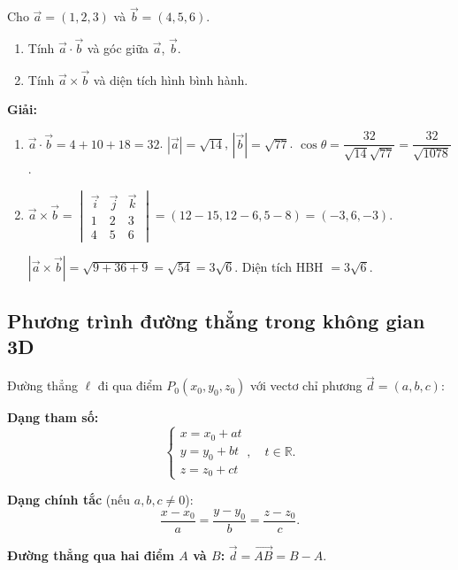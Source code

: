 \documentclass[12pt,a4paper]{article}
\begin{document}
\begin{vidu}
  Cho $\vec{a} = (1, 2, 3)$ và $\vec{b} = (4, 5, 6)$.
  \begin{enumerate}[label=(\alph*)]
    \item Tính $\vec{a}\cdot\vec{b}$ và góc giữa $\vec{a}$, $\vec{b}$.
    \item Tính $\vec{a}\times\vec{b}$ và diện tích hình bình hành.
  \end{enumerate}

  \medskip\textbf{Giải:}
  \begin{enumerate}[label=(\alph*)]
    \item $\vec{a}\cdot\vec{b} = 4 + 10 + 18 = 32$. $|\vec{a}| = \sqrt{14}$, $|\vec{b}| = \sqrt{77}$.
      $\cos\theta = \dfrac{32}{\sqrt{14}\sqrt{77}} = \dfrac{32}{\sqrt{1078}}$.

    \item $\vec{a}\times\vec{b} = \begin{vmatrix}\vec{i}&\vec{j}&\vec{k}\\1&2&3\\4&5&6\end{vmatrix} = (12-15, 12-6, 5-8) = (-3, 6, -3)$.

      $|\vec{a}\times\vec{b}| = \sqrt{9+36+9} = \sqrt{54} = 3\sqrt{6}$. Diện tích HBH $= 3\sqrt{6}$.
  \end{enumerate}
\end{vidu}

\subsection{Phương trình đường thẳng trong không gian 3D}

\begin{dinhnghia}[title={Phương trình đường thẳng}]
  Đường thẳng $\ell$ đi qua điểm $P_0(x_0, y_0, z_0)$ với vectơ chỉ phương $\vec{d} = (a, b, c)$:

  \textbf{Dạng tham số:}
  \[
    \begin{cases} x = x_0 + at \\ y = y_0 + bt \\ z = z_0 + ct \end{cases}, \quad t \in \mathbb{R}.
  \]

  \textbf{Dạng chính tắc} (nếu $a, b, c \ne 0$):
  \[
    \frac{x - x_0}{a} = \frac{y - y_0}{b} = \frac{z - z_0}{c}.
  \]

  \textbf{Đường thẳng qua hai điểm $A$ và $B$:} $\vec{d} = \overrightarrow{AB} = B - A$.
\end{dinhnghia}
\end{document}
